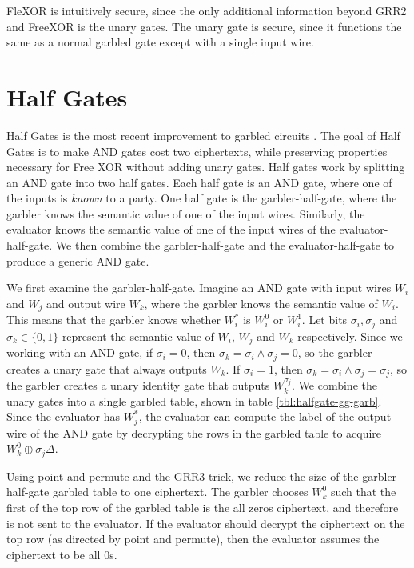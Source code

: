 FleXOR is intuitively secure, since the only additional information beyond GRR2 and FreeXOR is the unary gates.
The unary gate is secure, since it functions the same as a normal garbled gate except with a single input wire.

\section{Half Gates}
Half Gates is the most recent improvement to garbled circuits \cite{twohalves}.
The goal of Half Gates is to make AND gates cost two ciphertexts, while preserving properties necessary for Free XOR without adding unary gates. 
Half gates work by splitting an AND gate into two half gates.
Each half gate is an AND gate, where one of the inputs is \textit{known} to a party.
One half gate is the garbler-half-gate, where the garbler knows the semantic value of one of the input wires.
Similarly, the evaluator knows the semantic value of one of the input wires of the evaluator-half-gate.
We then combine the garbler-half-gate and the evaluator-half-gate to produce a generic AND gate.

We first examine the garbler-half-gate.
Imagine an AND gate with input wires $W_i$ and $W_j$ and output wire $W_k$, where the garbler knows the semantic value of $W_i$.
This means that the garbler knows whether $W_i^*$ is $W_i^0$ or $W_i^1$.
Let bits $\sigma_i, \sigma_j$ and $\sigma_k \in \{0,1\}$ represent the semantic value of $W_i$, $W_j$ and $W_k$ respectively.
Since we working with an AND gate, if $\sigma_i = 0$, then $\sigma_k = \sigma_i \wedge \sigma_j = 0$, so the garbler creates a unary gate that always outputs $W_k$.
If $\sigma_i = 1$, then $\sigma_k = \sigma_i \wedge \sigma_j = \sigma_j$, so the garbler creates a unary identity gate that outputs $W_k^{\sigma_j}$.
We combine the unary gates into a single garbled table, shown in table \ref{tbl:halfgate-gg-garb}.
Since the evaluator has $W_j^*$, the evaluator can compute the label of the output wire of the AND gate by decrypting the rows in the garbled table to acquire $W_k^0 \oplus \sigma_j \Delta$.

Using point and permute and the GRR3 trick, we reduce the size of the garbler-half-gate garbled table to one ciphertext.
The garbler chooses $W_k^0$ such that the first of the top row of the garbled table is the all zeros ciphertext, and therefore is not sent to the evaluator.
If the evaluator should decrypt the ciphertext on the top row (as directed by point and permute), then the evaluator assumes the ciphertext to be all 0s.

